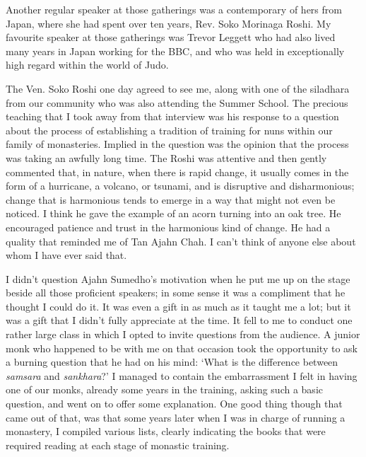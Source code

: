 Another regular speaker at those gatherings was a contemporary of hers
from Japan, where she had spent over ten years, Rev. Soko Morinaga Roshi\cite{soko}.
My favourite speaker at those gatherings was Trevor Leggett\cite{leggett}
who had also lived many years in Japan working for
the BBC, and who was held in exceptionally high regard within the world
of Judo.

The Ven. Soko Roshi one day agreed to see me, along with one of the
siladhara from our community who was also attending the Summer School.
The precious teaching that I took away from that interview was his
response to a question about the process of establishing a tradition of
training for nuns within our family of monasteries. Implied in the
question was the opinion that the process was taking an awfully long
time. The Roshi was attentive and then gently commented that, in nature,
when there is rapid change, it usually comes in the form of a hurricane,
a volcano, or tsunami, and is disruptive and disharmonious; change that
is harmonious tends to emerge in a way that might not even be noticed. I
think he gave the example of an acorn turning into an oak tree. He
encouraged patience and trust in the harmonious kind of change. He had a
quality that reminded me of Tan Ajahn Chah. I can't think of anyone else
about whom I have ever said that.

I didn't question Ajahn Sumedho's motivation when he put me up on the
stage beside all those proficient speakers; in some sense it was a
compliment that he thought I could do it. It was even a gift in as much
as it taught me a lot; but it was a gift that I didn't fully appreciate
at the time. It fell to me to conduct one rather large class in which I
opted to invite questions from the audience. A junior monk who happened
to be with me on that occasion took the opportunity to ask a burning
question that he had on his mind: `What is the difference between
\emph{samsara} and \emph{sankhara}?' I managed to contain the
embarrassment I felt in having one of our monks, already some years in
the training, asking such a basic question, and went on to offer some
explanation. One good thing though that came out of that, was that some
years later when I was in charge of running a monastery, I compiled
various lists, clearly indicating the books that were required reading
at each stage of monastic training.

